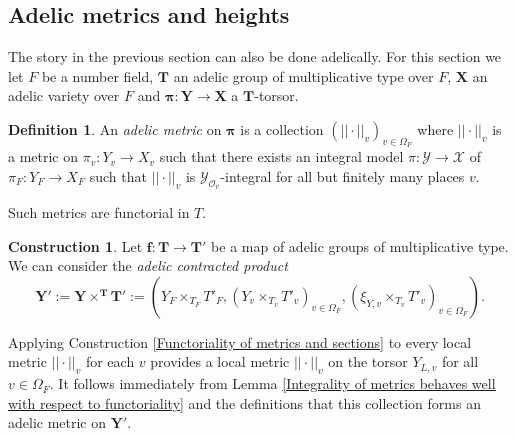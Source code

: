 \documentclass[a4paper,11pt,reqno]{amsart}
\theoremstyle{definition}
\newtheorem{definition}[theorem]{Definition}
\newtheorem{construction}[theorem]{Construction}
\begin{document}
\subsection{Adelic metrics and heights}
The story in the previous section can also be done adelically. For this section we let $F$ be a number field, $\mathbf{T}$ an adelic group of multiplicative type over $F$, $\mathbf{X}$ an adelic variety over $F$ and $\bm{\pi}: \mathbf{Y} \to \mathbf{X}$ a $\mathbf{T}$-torsor.
\begin{definition}
	An \emph{adelic metric} on $\bm{\pi}$ is a collection $(||\cdot||_v)_{v \in \Omega_F}$ where $||\cdot||_v$ is a metric on $\pi_v: Y_v \to X_v$ such that there exists an integral model $\pi: \mathcal{Y} \to \mathcal{X}$ of $\pi_F: Y_F \to X_F$ such that $||\cdot||_v$ is $\mathcal{Y}_{\mathcal{O}_v}$-integral for all but finitely many places $v$.
\end{definition}
Such metrics are functorial in $T$.
\begin{construction}
	Let $\mathbf{f}: \mathbf{T} \to \mathbf{T}'$ be a map of adelic groups of multiplicative type. We can consider the \emph{adelic contracted product}
	\begin{equation*}
		\mathbf{Y}' := \mathbf{Y} \times^{\mathbf{T}} \mathbf{T'} := (Y_F \times_{T_F} T'_F, (Y_v \times_{T_v} T'_v)_{v \in \Omega_F}, (\xi_{Y, v} \times_{T_v} T'_v)_{v \in \Omega_F}).
	\end{equation*}

	Applying Construction \ref{Functoriality of metrics and sections} to every local metric $||\cdot||_v$ for each $v$ provides a local metric $||\cdot||_v$ on the torsor $Y_{L, v}$ for all $v \in \Omega_F$. It follows immediately from Lemma \ref{Integrality of metrics behaves well with respect to functoriality} and the definitions that this collection forms an adelic metric on $\mathbf{Y}'$.
	\label{Functoriality of adelic metrics}
\end{construction}
\end{document}
